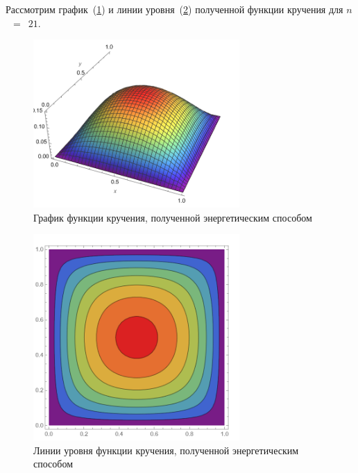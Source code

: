 \documentclass[12pt, a4paper]{article}
\begin{document}
Рассмотрим график~(\ref{ser_graph}) и линии уровня~(\ref{ser_levels}) полученной функции кручения для $n$~$=$~$21$.
\begin{figure}[!h]
	\centering
	\includegraphics[width=0.7\textwidth]{ser_graph}%
	\caption{График функции кручения, полученной энергетическим способом}
	\vspace*{-2mm}
	\label{ser_graph}
\end{figure}
\begin{figure}[!h]
	\centering
	\includegraphics[width=0.7\textwidth]{ser_levels}%
	\caption{Линии уровня функции кручения, полученной энергетическим способом}
	\vspace*{-2mm}
	\label{ser_levels}
\end{figure}
\newpage
\end{document}
